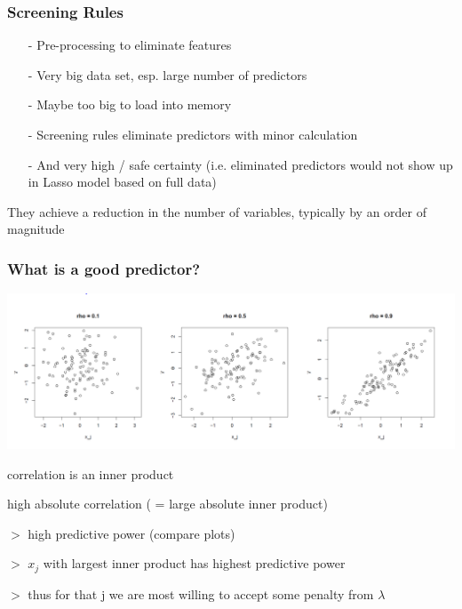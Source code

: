 \documentclass[handout]{beamer}
\begin{document}
\begin{frame}
\frametitle{Screening Rules}

\begin{itemize}
	\item[-] Pre-processing to eliminate features
	\item[-] Very big data set, esp. large number of predictors
	\item[-] Maybe too big to load into memory
	\item[-] Screening rules eliminate predictors with minor calculation
	\item[-] And very high / safe certainty (i.e. eliminated predictors would not show up in Lasso model based on full data)
\end{itemize}


They achieve a reduction in the number of variables, typically by an order of magnitude




\end{frame}

\begin{frame}
\frametitle{What is a good predictor?}

\includegraphics[width=\linewidth]{img/differentCorrelationPlots}

correlation is an inner product

high absolute correlation ( = large absolute inner product) 

$>$ high predictive power (compare plots) 

$>$ $x_j$ with largest inner product has highest predictive power 

$>$ thus for that j we are most willing to accept some penalty from $\lambda$

\end{frame}
\end{document}
